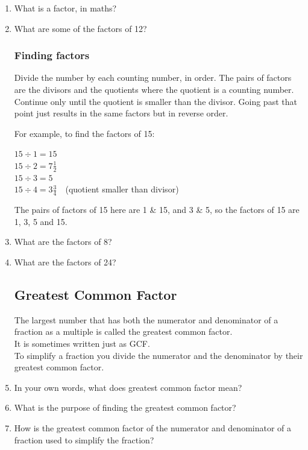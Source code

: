 \documentclass[14pt]{article}
\begin{document}
\begin{enumerate}
\item What is a factor, in maths?
\item What are some of the factors of 12?

\subsubsection*{Finding factors}
Divide the number by each counting number, in order. The pairs of factors are the divisors and the quotients where the quotient is a counting number. Continue only until the quotient is smaller than the divisor. Going past that point just results in the same factors but in reverse order. 

For example, to find the factors of 15:

\begin{doublespace}
$15 \div 1 = 15$\ \ \leftarrow\\
$15 \div 2 = 7 \frac{1}{2}$\\
$15 \div 3 = 5$\ \ \leftarrow\\
$15 \div 4 = 3 \frac{3}{4}$\ \ (quotient smaller than divisor)
\end{doublespace}

The pairs of factors of 15 here are 1 \&  15, and 3 \& 5, so the factors of 15 are 1, 3, 5 and 15.\\

\item What are the factors of 8?
\item What are the factors of 24?

\subsection*{Greatest Common Factor}
The largest number that has both the numerator and denominator of a fraction as a multiple is called the greatest common factor.\\

It is sometimes written just as GCF.\\

To simplify a fraction you divide the numerator and the denominator  by their greatest common factor.\\

\item In your own words, what does greatest common factor mean?
\item What is the purpose of finding the greatest common factor?
\item How is the greatest common factor of the numerator and denominator of a fraction used to simplify the fraction?\\


\end{enumerate}
\end{document}
